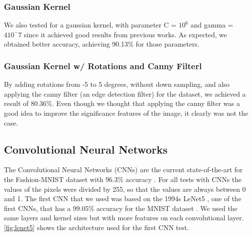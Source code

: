 \documentclass{article}
\begin{document}
\subsubsection{Gaussian Kernel}

We also tested for a gaussian kernel, with parameter C = $10^6$ and gamma = $4 10^-7$ since it achieved good results from previous works.
As expected, we obtained better accuracy, achieving 90.13\% for those parameters.

\subsubsection{Gaussian Kernel w/ Rotations and Canny Filterl}

By adding rotations from -5 to 5 degrees, without down sampling, and also applying the canny filter (an edge detection filter)
for the dataset, we achieved a result of 80.36\%. Even though we thought that applying the canny filter was a good idea to improve
the significance features of the image, it clearly was not the case.

\subsection{Convolutional Neural Networks}

     The Convolutional Neural Networks (CNNs) are the current state-of-the-art for the Fashion-MNIST dataset with 96.3\% accuracy \cite{randomerasingdataaugmentationpaper}. For all tests with CNNs the values of the pixels were divided by 255, so that the values are always between 0 and 1. The first CNN that we used was based on the 1994s LeNet5 \cite{yannLeCun:1998}, one of the first CNNs, that has a 99.05\% accuracy for the MNIST dataset \cite{yannLeCun:mnist}. We used the same layers and kernel sizes but with more features on each convolutional layer. \ref{fig:lenet5} shows the architecture used for the first CNN test.
\end{document}
